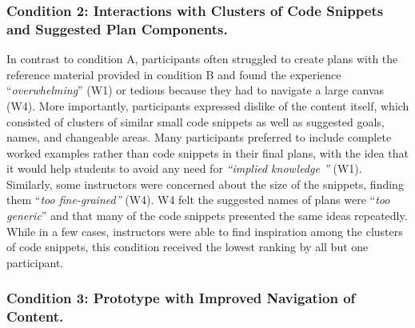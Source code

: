 \subsubsection{Condition 2: Interactions with Clusters of Code Snippets and Suggested Plan Components.}
\label{sec:workshop-findings-condition2}
In contrast to condition A, participants often struggled to create plans with the reference material provided in condition B and found the experience ``\textit{overwhelming}'' (W1) or tedious because they had to navigate a large canvas (W4).
More importantly, participants expressed dislike of the content itself, which consisted of clusters of similar small code snippets as well as suggested goals, names, and changeable areas. Many participants preferred to include complete worked examples rather than code snippets in their final plans, with the idea that it would help students to avoid any need for \textit{``implied knowledge ''} (W1). Similarly, some instructors were concerned about the size of the snippets, finding them ``\textit{too fine-grained''} (W4). 
W4 felt the suggested names of plans were ``\textit{too generic}'' and that many of the code snippets presented the same ideas repeatedly.
While in a few cases, instructors were able to find inspiration among the clusters of code snippets, this  condition received the lowest ranking by all but one participant.

\subsubsection{Condition 3: Prototype with Improved Navigation of Content.}


